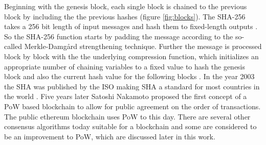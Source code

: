 Beginning with the genesis block, each single block is chained to the previous block by including the the previous hashes (figure \ref{fig:blocks}). The \ac{SHA-256} takes a 256 bit length of input
messages and hash them to fixed-length outputs \cite{van2014encyclopedia}. So the \ac{SHA-256} function starts by padding the message according to the so-called Merkle-Damg{\aa}rd strengthening technique. Further the message is processed block by block with the the underlying compression function, which initializes an appropriate number of chaining variables to a fixed value to hash the genesis block and also the current hash value for the following blocks \cite{coron2005merkle}. In the year 2003 the \ac{SHA} was published by the \ac{ISO} making \ac{SHA} a standard for most countries in the world \cite{isoSHA-256}. Five years later Satoshi Nakamoto proposed the first concept of a \ac{PoW} based blockchain to allow for public agreement on the order of transactions. The public ethereum blockchain uses \ac{PoW} to this day. There are several other consensus algorithms today suitable for a blockchain and some are considered to be an improvement to \ac{PoW}, which are discussed later in this work.

\clearpage

